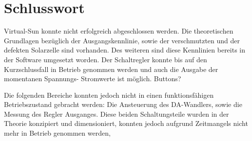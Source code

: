 \section{Schlusswort}

Virtual-Sun konnte nicht erfolgreich abgeschlossen werden. Die theoretischen Grundlagen bezüglich der Ausgangskennlinie, sowie der verschmutzten und der defekten Solarzelle sind vorhanden. Des weiteren sind diese Kennlinien bereits in der Software umgesetzt worden. Der Schaltregler konnte bis auf den Kurzschlussfall in Betrieb genommen werden und auch die Ausgabe der momentanen Spannungs- Stromwerte ist möglich. Buttons?

Die folgenden Bereiche konnten jedoch nicht in einen funktionsfähigen Betriebszustand gebracht werden: Die Ansteuerung des DA-Wandlers, sowie die Messung des Regler Ausganges. Diese beiden Schaltungsteile wurden in der Theorie konzipiert und dimensioniert, konnten jedoch aufgrund Zeitmangels nicht mehr in Betrieb genommen werden, 
